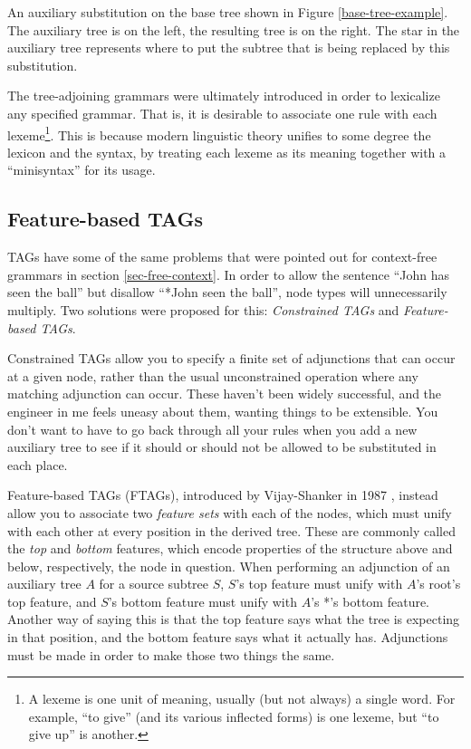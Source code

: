 \documentclass[12pt]{article}
\newcommand{\defn}[1]{\textit{#1}}
\begin{document}
\begin{Figure}
\begin{center}
\end{center}
\caption{An auxiliary substitution on the base tree shown in Figure
\ref{base-tree-example}.  The auxiliary tree is on the left, the
resulting tree is on the right.  The star in the auxiliary tree
represents where to put the subtree that is being replaced by this
substitution.}
\label{adjoining-substitution}
\end{Figure}

The tree-adjoining grammars were ultimately introduced in order to
lexicalize any specified grammar.  That is, it is desirable to associate
one rule with each lexeme\footnote{A lexeme is one unit of meaning,
usually (but not always) a single word.  For example, ``to give'' (and
its various inflected forms) is one lexeme, but ``to give up'' is
another.}.  This is because modern linguistic theory unifies to some
degree the lexicon and the syntax, by treating each lexeme as its
meaning together with a ``minisyntax'' for its usage.

\subsection{Feature-based TAGs}
\label{subsec-feature-tags}

TAGs have some of the same problems that were pointed out for
context-free grammars in section \ref{sec-free-context}.  In order to
allow the sentence ``John has seen the ball'' but disallow ``*John seen
the ball'', node types will unnecessarily multiply.  Two solutions were
proposed for this: \defn{Constrained TAGs} and \defn{Feature-based
TAGs}.

Constrained TAGs allow you to specify a finite set of adjunctions that
can occur at a given node, rather than the usual unconstrained operation
where any matching adjunction can occur.  These haven't been widely
successful, and the engineer in me feels uneasy about them, wanting
things to be extensible.  You don't want to have to go back through all
your rules when you add a new auxiliary tree to see if it should or
should not be allowed to be substituted in each place.

Feature-based TAGs (FTAGs), introduced by Vijay-Shanker in 1987
\cite{Vijay-Shanker-1987}, instead allow you to associate two
\defn{feature sets} with each of the nodes, which must unify with each
other at every position in the derived tree.  These are commonly called
the \defn{top} and \defn{bottom} features, which encode properties of
the structure above and below, respectively, the node in question.  When
performing an adjunction of an auxiliary tree $A$ for a source subtree
$S$, $S$'s top feature must unify with $A$'s root's top feature, and
$S$'s bottom feature must unify with $A$'s *'s bottom feature.  Another
way of saying this is that the top feature says what the tree is
expecting in that position, and the bottom feature says what it actually
has.  Adjunctions must be made in order to make those two things the
same.
\end{document}
